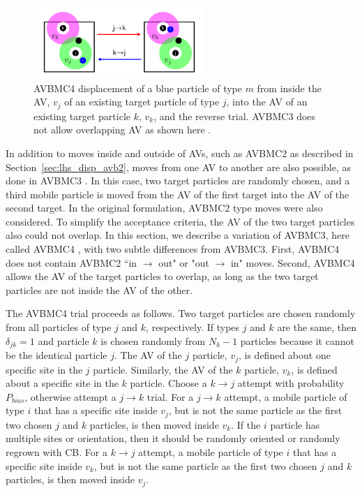 \documentclass[
  9pt,
  bestpractices,
  pubversion,
]{livecoms}
\begin{document}
\begin{figure}
\begin{centering}
\includegraphics[width=6.5cm]{../figures/avb4.pdf}
\caption{
AVBMC4 displacement of a blue particle of type $m$ from inside the AV, $v_j$ of an existing target particle of type $j$, into the AV of an existing target particle $k$, $v_k$, and the reverse trial.
AVBMC3 does not allow overlapping AV as shown here \cite{chen_improving_2001}.
}
\label{fig:avbmc4}
\end{centering}
\end{figure}

In addition to moves inside and outside of AVs, such as AVBMC2 as described in Section~\ref{sec:lhs_disp_avb2}, moves from one AV to another are also possible, as done in AVBMC3 \cite{chen_improving_2001}.
In this case, two target particles are randomly chosen, and a third mobile particle is moved from the AV of the first target into the AV of the second target.
In the original formulation, AVBMC2 type moves were also considered.
To simplify the acceptance criteria, the AV of the two target particles also could not overlap.
In this section, we describe a variation of AVBMC3, here called AVBMC4 \cite{siderius_flat-histogram_2024}, with two subtle differences from AVBMC3.
First, AVBMC4 does not contain AVBMC2 ``in $\rightarrow$ out" or "out $\rightarrow$ in" moves.
Second, AVBMC4 allows the AV of the target particles to overlap, as long as the two target particles are not inside the AV of the other.

The AVBMC4 trial proceeds as follows.
Two target particles are chosen randomly from all particles of type $j$ and $k$, respectively.
If types $j$ and $k$ are the same, then $\delta_{jk}=1$ and particle $k$ is chosen randomly from $N_k-1$ particles because it cannot be the identical particle $j$.
The AV of the $j$ particle, $v_j$, is defined about one specific site in the $j$ particle.
Similarly, the AV of the $k$ particle, $v_k$, is defined about a specific site in the $k$ particle.
Choose a $k\rightarrow j$ attempt with probability $P_{bias}$, otherwise attempt a $j\rightarrow k$ trial.
For a $j\rightarrow k$ attempt, a mobile particle of type $i$ that has a specific site inside $v_j$, but is not the same particle as the first two chosen $j$ and $k$ particles, is then moved inside $v_k$.
If the $i$ particle has multiple sites or orientation, then it should be randomly oriented or randomly regrown with CB.
For a $k\rightarrow j$ attempt, a mobile particle of type $i$ that has a specific site inside $v_k$, but is not the same particle as the first two chosen $j$ and $k$ particles, is then moved inside $v_j$.
\end{document}
